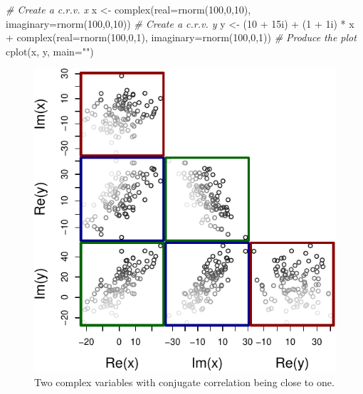 \documentclass[
]{book}
\newenvironment{Shaded}{\begin{snugshade}}{\end{snugshade}}
\newcommand{\AttributeTok}[1]{\textcolor[rgb]{0.77,0.63,0.00}{#1}}
\newcommand{\CommentTok}[1]{\textcolor[rgb]{0.56,0.35,0.01}{\textit{#1}}}
\newcommand{\DecValTok}[1]{\textcolor[rgb]{0.00,0.00,0.81}{#1}}
\newcommand{\FunctionTok}[1]{\textcolor[rgb]{0.00,0.00,0.00}{#1}}
\newcommand{\NormalTok}[1]{#1}
\newcommand{\OtherTok}[1]{\textcolor[rgb]{0.56,0.35,0.01}{#1}}
\newcommand{\SpecialCharTok}[1]{\textcolor[rgb]{0.00,0.00,0.00}{#1}}
\newcommand{\StringTok}[1]{\textcolor[rgb]{0.31,0.60,0.02}{#1}}
\begin{document}
\begin{Shaded}
\begin{Highlighting}[]
\CommentTok{\# Create a c.r.v. x}
\NormalTok{x }\OtherTok{\textless{}{-}} \FunctionTok{complex}\NormalTok{(}\AttributeTok{real=}\FunctionTok{rnorm}\NormalTok{(}\DecValTok{100}\NormalTok{,}\DecValTok{0}\NormalTok{,}\DecValTok{10}\NormalTok{), }\AttributeTok{imaginary=}\FunctionTok{rnorm}\NormalTok{(}\DecValTok{100}\NormalTok{,}\DecValTok{0}\NormalTok{,}\DecValTok{10}\NormalTok{))}
\CommentTok{\# Create a c.r.v. y}
\NormalTok{y }\OtherTok{\textless{}{-}}\NormalTok{ (}\DecValTok{10} \SpecialCharTok{+}\NormalTok{ 15i) }\SpecialCharTok{+}\NormalTok{ (}\DecValTok{1} \SpecialCharTok{+}\NormalTok{ 1i) }\SpecialCharTok{*}\NormalTok{ x }\SpecialCharTok{+}
    \FunctionTok{complex}\NormalTok{(}\AttributeTok{real=}\FunctionTok{rnorm}\NormalTok{(}\DecValTok{100}\NormalTok{,}\DecValTok{0}\NormalTok{,}\DecValTok{1}\NormalTok{), }\AttributeTok{imaginary=}\FunctionTok{rnorm}\NormalTok{(}\DecValTok{100}\NormalTok{,}\DecValTok{0}\NormalTok{,}\DecValTok{1}\NormalTok{))}
\CommentTok{\# Produce the plot}
\FunctionTok{cplot}\NormalTok{(x, y, }\AttributeTok{main=}\StringTok{""}\NormalTok{)}
\end{Highlighting}
\end{Shaded}

\begin{figure}
\centering
\includegraphics{Svetunkov---Svetunkov---Complex-Dynamic-Models_files/figure-latex/crvCorConjugate-1.pdf}
\caption{\label{fig:crvCorConjugate}Two complex variables with conjugate correlation being close to one.}
\end{figure}
\end{document}
